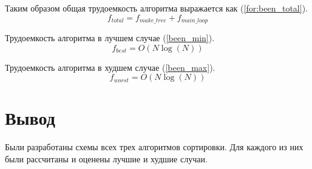 Таким образом общая трудоемкость алгоритма выражается как (\ref{for:been_total}).
\begin{equation}
	\label{for:been_total}
	f_{total} = f_{make\_tree} + f_{main\_loop}
\end{equation}

Трудоемкость алгоритма в лучшем случае (\ref{been_min}).
\begin{equation}
	\label{been_min}
	f_{best} = O(N\log(N))
\end{equation}

Трудоемкость алгоритма в худшем случае (\ref{been_max}).
\begin{equation}
	\label{been_max}
	f_{worst} = O(N\log(N))
\end{equation}


\section*{Вывод}
Были разработаны схемы всех трех алгоритмов сортировки. Для каждого из них были рассчитаны и оценены лучшие и худшие случаи.



